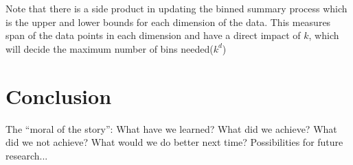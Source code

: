\documentclass[11pt]{article}       %
\begin{document}
Note that there is a side product in updating the binned summary process which is the upper and lower bounds for each dimension of the data. This measures span of the data points in each dimension and have a direct impact of $k$, which will decide the maximum number of bins needed($k^d$)


\section{Conclusion} \label{concl}

The ``moral of the story'': What have we learned? What did we achieve?
What did we not achieve? What would we do better next time? Possibilities
for future research...



\end{document}
